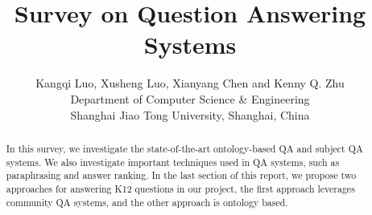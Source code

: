 \documentclass[letterpaper]{article}
\begin{document}
%
\title{Survey on Question Answering Systems}
\author{
Kangqi Luo, Xusheng Luo, Xianyang Chen and Kenny Q. Zhu\\
Department of Computer Science \& Engineering\\
Shanghai Jiao Tong University, Shanghai, China\\
}
\maketitle
\begin{abstract}
In this survey, we investigate the state-of-the-art ontology-based QA and subject QA systems.
We also investigate important techniques used in QA systems, such as paraphrasing and answer ranking.
In the last section of this report, we propose two approaches for answering K12 questions in our project, the first approach leverages community QA systems, and the other approach is ontology based.


\end{abstract}



%

%

%

%

%











%




\end{document}
